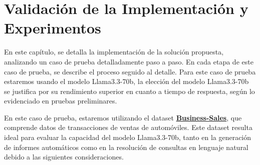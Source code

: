 \chapter{Validación de la Implementación y Experimentos}\label{chapter:implementation}

En este capítulo, se detalla la implementación de la solución propuesta, analizando un caso de prueba detalladamente paso a paso.  En cada etapa de este caso de prueba, se describe el proceso seguido al detalle. Para este caso de prueba estaremos usando el modelo Llama3.3-70b, la elección del modelo Llama3.3-70b se justifica por su rendimiento superior en cuanto a tiempo de respuesta, según lo evidenciado en pruebas preliminares.

En este caso de prueba, estaremos utilizando el dataset \href{https://huggingface.co/datasets/sayanroy058/Business-Sales/viewer}{\textbf{Business-Sales}}, que comprende datos de transacciones de ventas de automóviles. Este dataset resulta ideal para evaluar la capacidad del modelo Llama3.3-70b, tanto en la generación de informes automáticos como en la resolución de consultas en lenguaje natural debido a las siguientes consideraciones.

